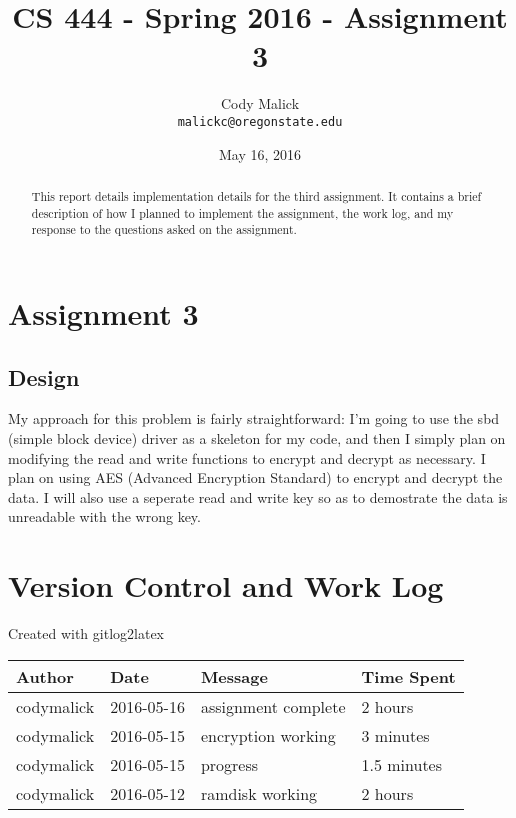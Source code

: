 \documentclass[10pt,letterpaper,onecolumn,draftclsnofoot]{IEEEtran}
\begin{document}
\begin{titlepage}
  \title{CS 444 - Spring 2016 - Assignment 3}
  \author{Cody Malick\\
  \texttt{malickc@oregonstate.edu}}
  \date{May 16, 2016}
  \maketitle
  \vspace*{2cm}
  \begin{abstract}
      \noindent This report details implementation details for the third assignment.
      It contains a brief description of how I planned to implement the assignment,
      the work log, and my response to the questions asked on the assignment. \end{abstract}

\end{titlepage}

\tableofcontents
\clearpage

\section{Assignment 3}
  \subsection{Design}
	My approach for this problem is fairly straightforward: I'm going to use
	the sbd (simple block device) driver as a skeleton for my code, and then
	I simply plan on modifying the read and write functions to encrypt and
	decrypt as necessary. I plan on using AES (Advanced Encryption Standard)
	to encrypt and decrypt the data. I will also use a seperate read and write
	key so as to demostrate the data is unreadable with the wrong key.

\section{Version Control and Work Log}
Created with gitlog2latex
\begin{center}
\begin{longtabu} to \textwidth {|
    X[4,l]|
    X[3,c]|
    X[8,l]|
    X[4,1]|}
    \hline
    \textbf{Author} & \textbf{Date} & \textbf{Message} & \textbf{Time Spent} \\ \hline
codymalick & 2016-05-16 & assignment complete & 2 hours \\ \hline
codymalick & 2016-05-15 & encryption working & 3 minutes \\ \hline
codymalick & 2016-05-15 & progress & 1.5 minutes \\ \hline
codymalick & 2016-05-12 & ramdisk working & 2 hours \\ \hline
\end{longtabu}
\end{center}
\end{document}
